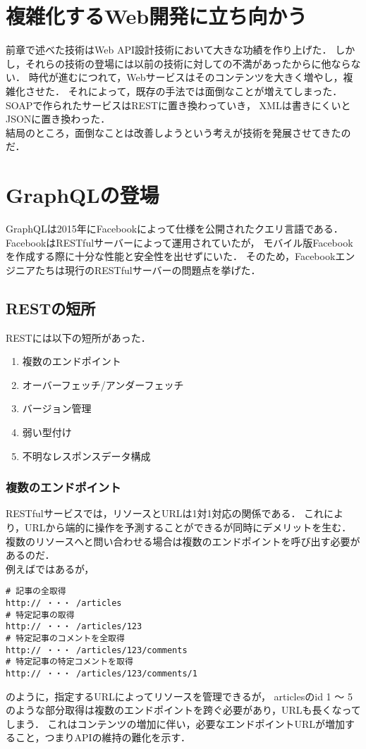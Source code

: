 \documentclass[11pt,a4paper]{jsarticle}
\begin{document}
\section{複雑化するWeb開発に立ち向かう}
前章で述べた技術はWeb API設計技術において大きな功績を作り上げた．
しかし，それらの技術の登場には以前の技術に対しての不満があったからに他ならない．
時代が進むにつれて，Webサービスはそのコンテンツを大きく増やし，複雑化させた．
それによって，既存の手法では面倒なことが増えてしまった．
SOAPで作られたサービスはRESTに置き換わっていき，
XMLは書きにくいとJSONに置き換わった．\\
結局のところ，面倒なことは改善しようという考えが技術を発展させてきたのだ．

\section{GraphQLの登場}
GraphQLは2015年にFacebookによって仕様を公開されたクエリ言語である．
FacebookはRESTfulサーバーによって運用されていたが，
モバイル版Facebookを作成する際に十分な性能と安全性を出せずにいた．
そのため，Facebookエンジニアたちは現行のRESTfulサーバーの問題点を挙げた．
\subsection{RESTの短所}
RESTには以下の短所があった．
\begin{enumerate}
    \item 複数のエンドポイント
    \item オーバーフェッチ/アンダーフェッチ
    \item バージョン管理
    \item 弱い型付け
    \item 不明なレスポンスデータ構成
\end{enumerate}
\subsubsection{複数のエンドポイント}
RESTfulサービスでは，リソースとURLは1対1対応の関係である．
これにより，URLから端的に操作を予測することができるが同時にデメリットを生む．
複数のリソースへと問い合わせる場合は複数のエンドポイントを呼び出す必要があるのだ．\\
例えばではあるが，
\begin{verbatim}
# 記事の全取得
http:// ・・・ /articles
# 特定記事の取得
http:// ・・・ /articles/123
# 特定記事のコメントを全取得
http:// ・・・ /articles/123/comments
# 特定記事の特定コメントを取得
http:// ・・・ /articles/123/comments/1
\end{verbatim}
のように，指定するURLによってリソースを管理できるが，
articlesのid 1 ～ 5のような部分取得は複数のエンドポイントを跨ぐ必要があり，URLも長くなってしまう．
これはコンテンツの増加に伴い，必要なエンドポイントURLが増加すること，つまりAPIの維持の難化を示す．
\end{document}
